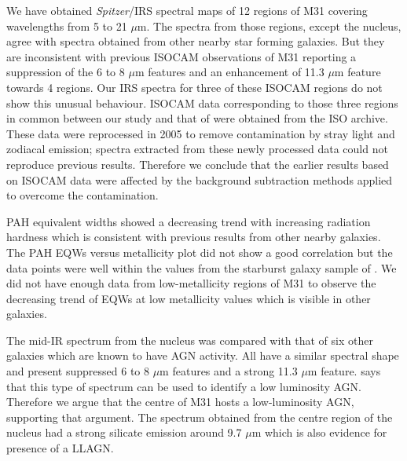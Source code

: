 We have obtained {\em Spitzer}/IRS spectral maps of 12 regions of M31 covering wavelengths from 5 to 21 $\mu$m. The spectra from those regions, except the nucleus, agree with spectra obtained from other nearby  star forming galaxies. But they are inconsistent with previous ISOCAM observations of M31 \citep{1998Cesarsky} reporting a suppression of the 6 to 8 $\mu$m features and an enhancement of 11.3 $\mu$m feature towards 4 regions. Our IRS spectra for three of these ISOCAM regions do not show this unusual behaviour. ISOCAM data corresponding to those three regions in common between our study and that of \citep{1998Cesarsky} were obtained from the ISO archive. These data were reprocessed in 2005 to remove contamination by stray light and zodiacal emission; spectra extracted from these newly processed data could not reproduce previous results. Therefore we conclude that the earlier results based on ISOCAM data were affected by the background subtraction methods applied to overcome the contamination.

PAH equivalent widths showed a decreasing trend with increasing radiation hardness which is consistent with previous results from other nearby galaxies. The PAH EQWs versus metallicity plot did not show a good correlation but the data points were well within the values from the starburst galaxy sample of \citet{Engelbracht_2008}. We did not have enough data from low-metallicity regions of M31 to observe the decreasing trend of EQWs at low metallicity values which is visible in other galaxies.

The mid-IR spectrum from the nucleus was compared with that of six other galaxies which are known to have AGN activity. All have a similar spectral shape and present suppressed 6 to 8 $\mu$m features and a strong 11.3 $\mu$m feature. \citealt{Smith:2007lr} says that this type of spectrum can be used to identify a low luminosity AGN. Therefore we argue that the centre of M31 hosts a low-luminosity AGN, supporting that argument. The spectrum obtained from the centre region of the nucleus had a strong silicate emission around 9.7 $\mu$m which is also evidence for presence of a LLAGN. 
